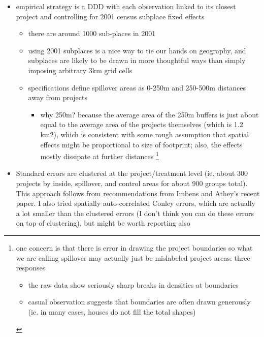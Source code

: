 \documentclass[12pt]{article}
\begin{document}
\begin{itemize}
\item empirical strategy is a DDD with each observation linked to its closest project and controlling for 2001 census subplace fixed effects
	\begin{itemize}
		\item there are around 1000 sub-places in 2001
		\item using 2001 subplaces is a nice way to tie our hands on geography, and subplaces are likely to be drawn in more thoughtful ways than simply imposing arbitrary 3km grid cells
		\item specifications define spillover areas as 0-250m and 250-500m distances away from projects
			\begin{itemize}
				\item why 250m?  because the average area of the 250m buffers is just about equal to the average area of the projects themselves (which is 1.2 km2), which is consistent with some rough assumption that spatial effects might be proportional to size of footprint; also, the effects mostly dissipate at further distances
				\footnote{one concern is that there is error in drawing the project boundaries so what we are calling spillover may actually just be mislabeled project areas: three responses
					\begin{itemize}
						\item the raw data show seriously sharp breaks in densities at boundaries
						\item casual observation suggests that boundaries are often drawn generously (ie. in many cases, houses do not fill the total shapes)
					\end{itemize}}
			\end{itemize}
	\end{itemize}

\item Standard errors are clustered at the project/treatment level (ie. about 300 projects by inside, spillover, and control areas for about 900 groups total).  This approach follows from recommendations from Imbens and Athey's recent paper.  I also tried spatially auto-correlated Conley errors, which are actually a lot smaller than the clustered errors (I don't think you can do these errors on top of clustering), but might be worth reporting also


\end{itemize}
\end{document}
